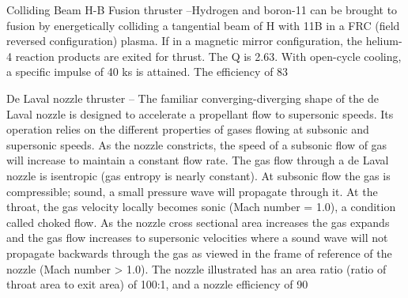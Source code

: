 \documentclass[a4paper]{book}
\begin{document}
Colliding Beam H-B Fusion thruster –Hydrogen and boron-11 can be brought to fusion by energetically colliding a tangential beam of H with 11B in a FRC (field reversed configuration) plasma.  If in a magnetic mirror configuration, the helium-4 reaction products are exited for thrust.  The Q is 2.63. With open-cycle cooling, a specific impulse of 40 ks is attained. The efficiency of 83%

De Laval nozzle thruster – The familiar converging-diverging shape of the de Laval nozzle is designed to accelerate a propellant flow to supersonic speeds. Its operation relies on the different properties of gases flowing at subsonic and supersonic speeds. As the nozzle constricts, the speed of a subsonic flow of gas will increase to maintain a constant flow rate. The gas flow through a de Laval nozzle is isentropic (gas entropy is nearly constant). At subsonic flow the gas is compressible; sound, a small pressure wave will propagate through it. At the throat, the gas velocity locally becomes sonic (Mach number = 1.0), a condition called choked flow. As the nozzle cross sectional area increases the gas expands and the gas flow increases to supersonic velocities where a sound wave will not propagate backwards through the gas as viewed in the frame of reference of the nozzle (Mach number > 1.0).  The nozzle illustrated has an area ratio (ratio of throat area to exit area) of 100:1, and a nozzle efficiency of 90%
 
\end{document}
